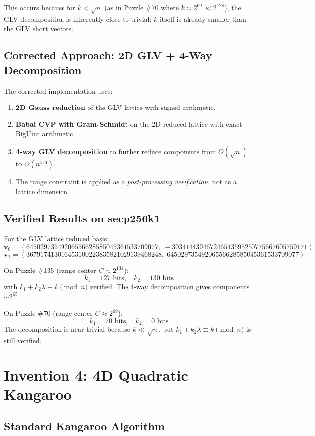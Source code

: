 \documentclass[11pt,a4paper]{article}
\theoremstyle{definition}
\newcommand{\sqn}{\sqrt{n}}
\begin{document}
This occurs because for $k < \sqn$ (as in Puzzle \#70 where $k \approx 2^{69} \ll 2^{128}$), the GLV decomposition is inherently close to trivial: $k$ itself is already smaller than the GLV short vectors.

\subsection{Corrected Approach: 2D GLV + 4-Way Decomposition}

The corrected implementation uses:
\begin{enumerate}[leftmargin=2em]
    \item \textbf{2D Gauss reduction} of the GLV lattice with signed arithmetic.
    \item \textbf{Babai CVP with Gram-Schmidt} on the 2D reduced lattice with exact BigUint arithmetic.
    \item \textbf{4-way GLV decomposition} to further reduce components from $O(\sqn)$ to $O(n^{1/4})$.
    \item The range constraint is applied as a \emph{post-processing verification}, not as a lattice dimension.
\end{enumerate}

\subsection{Verified Results on secp256k1}

For the GLV lattice reduced basis:
$$\mathbf{v}_0 = (64502973549206556628585045361533709077,\; -303414439467246543595250775667605759171)$$
$$\mathbf{v}_1 = (367917413016453100223835821029139468248,\; 64502973549206556628585045361533709077)$$

On Puzzle \#135 (range center $C \approx 2^{134}$):
$$k_1 = 127 \text{ bits}, \quad k_2 = 130 \text{ bits}$$
with $k_1 + k_2\lambda \equiv k \pmod{n}$ verified. The 4-way decomposition gives components $\sim 2^{65}$.

On Puzzle \#70 (range center $C \approx 2^{69}$):
$$k_1 = 70 \text{ bits}, \quad k_2 = 0 \text{ bits}$$
The decomposition is near-trivial because $k \ll \sqn$, but $k_1 + k_2\lambda \equiv k \pmod{n}$ is still verified.

\section{Invention 4: 4D Quadratic Kangaroo}

\subsection{Standard Kangaroo Algorithm}
\end{document}
